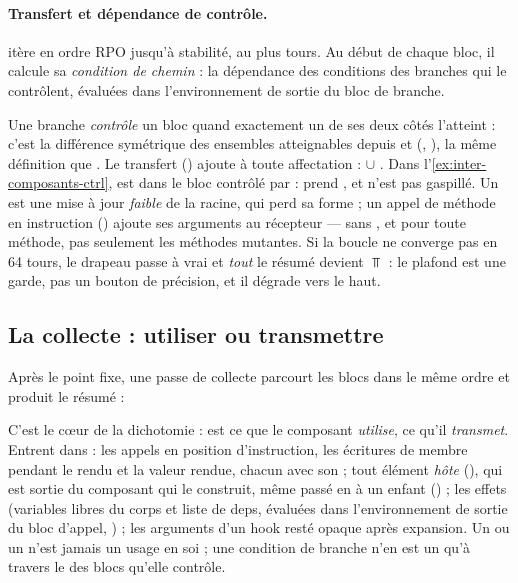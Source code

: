 \paragraph{Transfert et dépendance de contrôle.}  itère en ordre RPO jusqu'à
stabilité, au plus  tours. Au début de chaque bloc, il calcule sa
\emph{condition de chemin}  : la dépendance des conditions des branches qui le
contrôlent, évaluées dans l'environnement de sortie du bloc de branche.


Une branche \emph{contrôle} un bloc quand exactement un de ses deux côtés l'atteint : c'est la
différence symétrique des ensembles atteignables depuis  et 
(, ), la même définition
que . Le transfert () ajoute  à
toute affectation :  $\cup$ . Dans l'\cref{ex:inter-composants-ctrl},
 est dans le bloc contrôlé par  :  prend
, et  n'est pas gaspillé. Un  est une
mise à jour \emph{faible} de la racine, qui perd sa forme ; un appel de méthode en instruction
() ajoute ses arguments au récepteur --- sans , et pour toute méthode,
pas seulement les méthodes mutantes. Si la boucle ne converge pas en 64 tours, le drapeau
 passe à vrai et \emph{tout} le résumé devient $\Top$ : le plafond est une garde, pas
un bouton de précision, et il dégrade vers le haut.

\subsection{La collecte : utiliser ou transmettre}
\label{sec:inter-composants-collecte}

Après le point fixe, une passe de collecte parcourt les blocs dans le même ordre et produit le
résumé :


C'est le cœur de la dichotomie :  est ce que le composant \emph{utilise},
 ce qu'il \emph{transmet}. Entrent dans  : les appels en position
d'instruction, les écritures de membre pendant le rendu et la valeur rendue, chacun avec son
 ; tout élément \emph{hôte} (), qui est sortie du composant qui le
construit, même passé en  à un enfant () ;
les effets (variables libres du corps et liste de deps, évaluées dans l'environnement de sortie
du bloc d'appel, ) ; les arguments d'un hook resté opaque
après expansion. Un  ou un  n'est jamais un usage en soi ; une condition de
branche n'en est un qu'à travers le  des blocs qu'elle contrôle.

